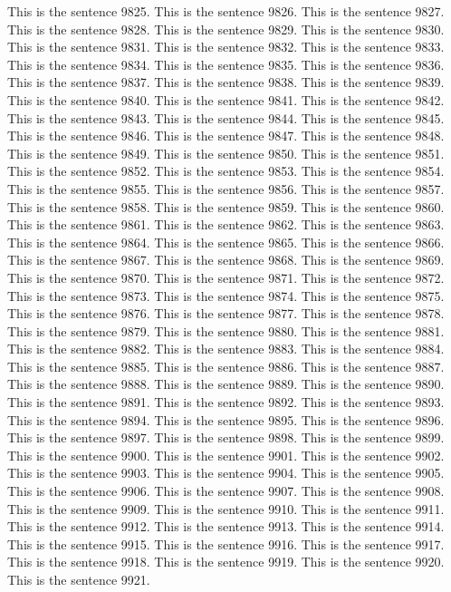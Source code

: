 \documentclass{article}
\begin{document}
This is the sentence 9825.
This is the sentence 9826.
This is the sentence 9827.
This is the sentence 9828.
This is the sentence 9829.
This is the sentence 9830.
This is the sentence 9831.
This is the sentence 9832.
This is the sentence 9833.
This is the sentence 9834.
This is the sentence 9835.
This is the sentence 9836.
This is the sentence 9837.
This is the sentence 9838.
This is the sentence 9839.
This is the sentence 9840.
This is the sentence 9841.
This is the sentence 9842.
This is the sentence 9843.
This is the sentence 9844.
This is the sentence 9845.
This is the sentence 9846.
This is the sentence 9847.
This is the sentence 9848.
This is the sentence 9849.
This is the sentence 9850.
This is the sentence 9851.
This is the sentence 9852.
This is the sentence 9853.
This is the sentence 9854.
This is the sentence 9855.
This is the sentence 9856.
This is the sentence 9857.
This is the sentence 9858.
This is the sentence 9859.
This is the sentence 9860.
This is the sentence 9861.
This is the sentence 9862.
This is the sentence 9863.
This is the sentence 9864.
This is the sentence 9865.
This is the sentence 9866.
This is the sentence 9867.
This is the sentence 9868.
This is the sentence 9869.
This is the sentence 9870.
This is the sentence 9871.
This is the sentence 9872.
This is the sentence 9873.
This is the sentence 9874.
This is the sentence 9875.
This is the sentence 9876.
This is the sentence 9877.
This is the sentence 9878.
This is the sentence 9879.
This is the sentence 9880.
This is the sentence 9881.
This is the sentence 9882.
This is the sentence 9883.
This is the sentence 9884.
This is the sentence 9885.
This is the sentence 9886.
This is the sentence 9887.
This is the sentence 9888.
This is the sentence 9889.
This is the sentence 9890.
This is the sentence 9891.
This is the sentence 9892.
This is the sentence 9893.
This is the sentence 9894.
This is the sentence 9895.
This is the sentence 9896.
This is the sentence 9897.
This is the sentence 9898.
This is the sentence 9899.
This is the sentence 9900.
This is the sentence 9901.
This is the sentence 9902.
This is the sentence 9903.
This is the sentence 9904.
This is the sentence 9905.
This is the sentence 9906.
This is the sentence 9907.
This is the sentence 9908.
This is the sentence 9909.
This is the sentence 9910.
This is the sentence 9911.
This is the sentence 9912.
This is the sentence 9913.
This is the sentence 9914.
This is the sentence 9915.
This is the sentence 9916.
This is the sentence 9917.
This is the sentence 9918.
This is the sentence 9919.
This is the sentence 9920.
This is the sentence 9921.
\end{document}
